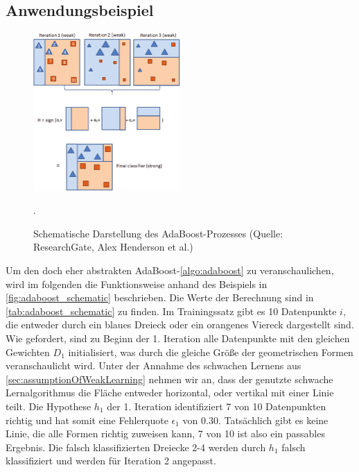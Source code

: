 \subsection{Anwendungsbeispiel}
\begin{figure} %
    \centering
    \includegraphics[width=0.5\textwidth]{Images/adaBoostSchemaatic.png}
    \caption[Schematische Darstellung des AdaBoost-Prozesses]{Schematische Darstellung des AdaBoost-Prozesses (Quelle: ResearchGate, Alex Henderson et al.)}.
    \label{fig:adaboost_schematic}
  \end{figure}

Um den doch eher abstrakten AdaBoost-\autoref{algo:adaboost} zu veranschaulichen, wird im folgenden die Funktionsweise anhand des Beispiels in \autoref{fig:adaboost_schematic} beschrieben. Die Werte der Berechnung sind in \autoref{tab:adaboost_schematic} zu finden. 
\newline
Im Trainingssatz gibt es 10 Datenpunkte \( i \), die entweder durch ein blaues Dreieck oder ein orangenes Viereck dargestellt sind. Wie gefordert, sind zu Beginn der 1. Iteration alle Datenpunkte  mit den gleichen Gewichten \( D_1 \) initialisiert, was  durch die gleiche Größe der geometrischen Formen veranschaulicht wird.
\newline
Unter der Annahme des schwachen Lernens aus \autoref{sec:assumptionOfWeakLearning} nehmen wir an, dass der genutzte schwache Lernalgorithmus die Fläche entweder horizontal, oder vertikal mit einer Linie teilt. Die Hypothese \( h_1 \) der 1. Iteration identifiziert 7 von 10 Datenpunkten richtig und hat somit eine Fehlerquote \( \epsilon_1 \) von 0.30. Tatsächlich gibt es keine Linie, die alle Formen richtig zuweisen kann, 7 von 10 ist also ein passables Ergebnis.
\newline
Die falsch klassifizierten Dreiecke 2-4 werden durch \( h_1 \) falsch klassifiziert und werden für Iteration 2 angepasst. 

